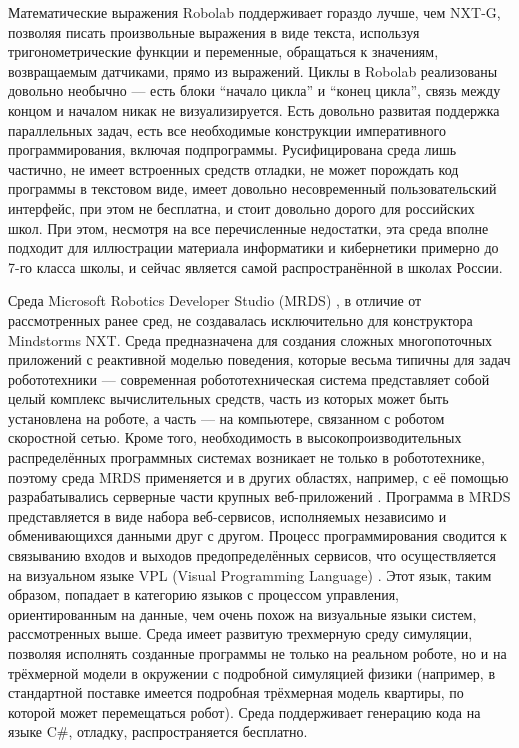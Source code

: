 Математические выражения Robolab поддерживает гораздо лучше, чем NXT-G, позволяя писать 
произвольные выражения в виде текста, используя тригонометрические функции и переменные, 
обращаться к значениям, возвращаемым датчиками, прямо из выражений. Циклы в Robolab 
реализованы довольно необычно --- есть блоки "`начало цикла"' и "`конец цикла"', связь 
между концом и началом никак не визуализируется. Есть довольно развитая поддержка 
параллельных задач, есть все необходимые конструкции императивного программирования, 
включая подпрограммы. Русифицирована среда лишь частично, не имеет встроенных средств 
отладки, не может порождать код программы в текстовом виде, имеет довольно несовременный 
пользовательский интерфейс, при этом не бесплатна, и стоит довольно дорого для российских 
школ. При этом, несмотря на все перечисленные недостатки, эта среда вполне подходит 
для иллюстрации материала информатики и кибернетики примерно до 7-го класса школы,
и сейчас является самой распространённой в школах России.

Среда Microsoft Robotics Developer Studio (MRDS)%
, в отличие от рассмотренных ранее сред, не создавалась исключительно для конструктора 
Mindstorms NXT. Среда предназначена для создания сложных многопоточных приложений с 
реактивной моделью поведения, которые весьма типичны для задач робототехники --- современная 
робототехническая система представляет собой целый комплекс вычислительных средств, 
часть из которых может быть установлена на роботе, а часть --- на компьютере, связанном 
с роботом скоростной сетью. Кроме того, необходимость в высокопроизводительных распределённых 
программных системах возникает не только в робототехнике, поэтому среда MRDS применяется 
и в других областях, например, с её помощью разрабатывались серверные части крупных веб-приложений%
. Программа в MRDS представляется в виде набора веб-сервисов, исполняемых независимо 
и обменивающихся данными друг с другом. Процесс программирования сводится к связыванию 
входов и выходов предопределённых сервисов, что осуществляется на визуальном языке 
VPL (Visual Programming Language)%
. Этот язык, таким образом, попадает в категорию языков с процессом управления, ориентированным 
на данные, чем очень похож на визуальные языки систем, рассмотренных выше. Среда имеет 
развитую трехмерную среду симуляции, позволяя исполнять созданные программы не только 
на реальном роботе, но и на трёхмерной модели в окружении с подробной симуляцией физики 
(например, в стандартной поставке имеется подробная трёхмерная модель квартиры, по которой 
может перемещаться робот). Среда поддерживает генерацию кода на языке C\#, отладку, 
распространяется бесплатно.


